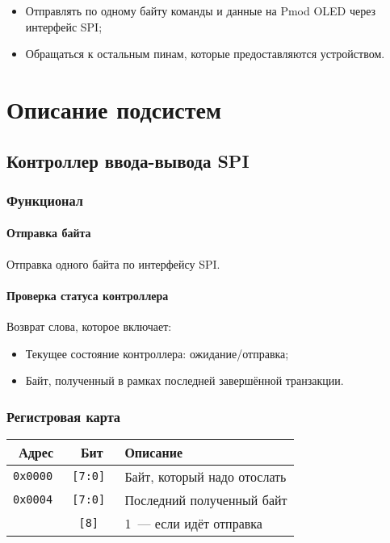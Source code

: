 \documentclass[12pt, a4paper] {ncc}
\begin{document}
\begin{itemize}
    \item Отправлять по одному байту команды и данные на Pmod OLED через
        интерфейс SPI;
    \item Обращаться к остальным пинам, которые предоставляются устройством.
\end{itemize}

\section{Описание подсистем}

\subsection{Контроллер ввода-вывода SPI}

\subsubsection{Функционал}

\paragraph{Отправка байта} Отправка одного байта по интерфейсу SPI.

\paragraph{Проверка статуса контроллера} Возврат слова, которое включает:

\begin{itemize}
	\item Текущее состояние контроллера: ожидание/отправка;
	\item Байт, полученный в рамках последней завершённой транзакции.
\end{itemize}

\subsubsection{Регистровая карта}

\begin{tabular}{|c|c|l|}
        \hline
        \bf Адрес & \bf Бит & \bf Описание \\
        \hline
        \tt 0x0000 & \tt [7:0] & Байт, который надо отослать \\
        \hline
        \tt 0x0004 & \tt [7:0] & Последний полученный байт \\
                   & \tt [8] & 1~--- если идёт отправка \\
        \hline
\end{tabular}
\end{document}
